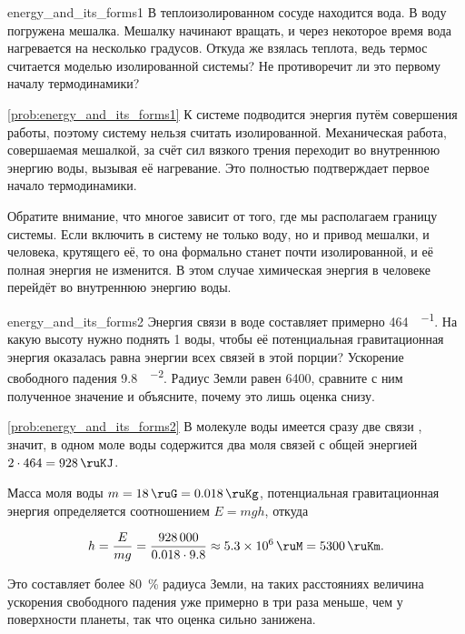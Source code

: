\begin{problem}{}{energy_and_its_forms1}
    В теплоизолированном сосуде находится вода. В воду погружена мешалка. Мешалку начинают вращать, и через некоторое время вода нагревается на несколько градусов. Откуда же взялась теплота, ведь термос считается моделью изолированной системы? Не противоречит ли это первому началу термодинамики?
    \begin{sol}{\ref{prob:energy_and_its_forms1}}
        К системе подводится энергия путём совершения работы, поэтому систему нельзя считать изолированной. Механическая работа, совершаемая мешалкой, за счёт сил вязкого трения переходит во внутреннюю энергию воды, вызывая её нагревание. Это полностью подтверждает первое начало термодинамики.

        Обратите внимание, что многое зависит от того, где мы располагаем границу системы. Если включить в систему не только воду, но и привод мешалки, и человека, крутящего её, то она формально станет почти изолированной, и её полная энергия не изменится. В этом случае химическая энергия в человеке перейдёт во внутреннюю энергию воды.
    \end{sol}
\end{problem}

\begin{problem}{}{energy_and_its_forms2}
    Энергия связи  в воде составляет примерно \qty{464}{\ruKJ\per\ruMole}. На какую высоту нужно поднять \qty{1}{\ruMole} воды, чтобы её потенциальная гравитационная энергия оказалась равна энергии всех связей  в этой порции? Ускорение свободного падения \qty{9,8}{\ruM\per\ruS\squared}. Радиус Земли равен \qty{6400}{\ruKm}, сравните с ним полученное значение и объясните, почему это лишь оценка снизу.
    \begin{sol}{\ref{prob:energy_and_its_forms2}}
        В молекуле воды имеется сразу две связи , значит, в одном моле воды содержится два моля связей с общей энергией $2 \cdot 464 = \qty{928}{\ruKJ}$.

        Масса моля воды $m = \qty{18}{\ruG} = \qty{0,018}{\ruKg}$, потенциальная гравитационная энергия определяется соотношением $E = mgh$, откуда

        \begin{equation*}
            h = \frac{E}{mg} = \frac{\num{928000}}{\num{0,018} \cdot \num{9,8}} \approx \qty{5,3e6}{\ruM} = \qty{5300}{\ruKm}.
        \end{equation*}

        Это составляет более \qty{80}{\percent} радиуса Земли, на таких расстояниях величина ускорения свободного падения уже примерно в три раза меньше, чем у поверхности планеты, так что оценка сильно занижена.
    \end{sol}
\end{problem}

